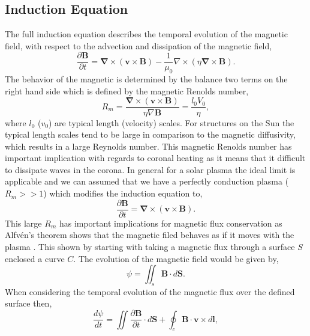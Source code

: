 \documentclass[12pt]{ociamthesis}
\newcommand{\bs}[1]{\boldsymbol{#1}}
\newcommand{\bn}{\boldsymbol{\nabla}}
\begin{document}
\subsection{Induction Equation}
\label{section:cont_eq}
The full induction equation describes the temporal evolution of the magnetic field, with respect to the advection and dissipation of the magnetic field,
\begin{equation}\label{eq89}
\frac{\partial \boldsymbol{B}}{\partial t} = \bn \times (\boldsymbol{v} \times \boldsymbol{B}) - \frac{1}{\mu_0} \nabla \times (\eta \bn \times \boldsymbol{B}).
\end{equation}
The behavior of the magnetic is determined by the balance two terms on the right hand side which is defined by the magnetic Renolds number, 
\begin{equation}
    R_m = \frac{\bn \times (\boldsymbol{v} \times \boldsymbol{B})}{\eta \nabla \bs{B}}=\frac{l_0 V_0}{\eta},
\end{equation}
where $l_0$ ($v_0$) are typical length (velocity) scales. For structures on the Sun the typical length scales tend to be large in comparison to the magnetic diffusivity, which results in a large Reynolds number. This magnetic Renolds number has important implication with regards to coronal heating as it means that it difficult to dissipate waves in the corona. In general for a solar plasma the ideal limit is applicable and we can assumed that we have a perfectly conduction plasma ($R_m>>1$) which modifies the induction equation to,
\begin{equation}\label{perf_induct}
\frac{\partial \boldsymbol{B}}{\partial t} = \bn \times (\boldsymbol{v} \times \boldsymbol{B}).
\end{equation}
This large $R_m$ has important implications for magnetic flux conservation as Alfv\'{e}n's theorem shows that the magnetic filed behaves as if it moves with the plasma \citep{priest2014magnetohydrodynamics}. This shown by starting with taking a magnetic flux through a surface $S$ enclosed a curve $C$. The evolution of the magnetic field would be given by,
\begin{equation}
    \psi = \iint_s \bs{B} \cdot d\bs{S}.
\end{equation}
When considering the temporal evolution of the magnetic flux over the defined surface then,
\begin{equation}
    \frac{d \psi}{ dt} = \iint \frac{\partial \bs{B}}{ \partial t} \cdot d\bs{S} + \oint_c  \bs{B} \cdot \bs{v} \times d\bs{l},
\end{equation}
\end{document}
